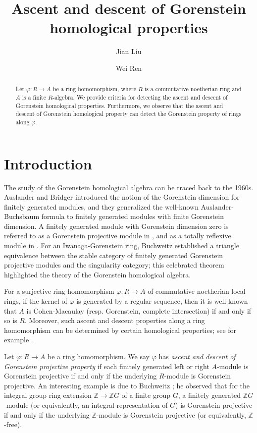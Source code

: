 \documentclass{amsart}
\author[Jian Liu]{Jian Liu}
\author{Wei Ren}
\title{Ascent and descent of Gorenstein homological properties}
\date{}
\newcommand{\Z}{\mathbb{Z}}
\newcommand{\0}{{\bf{0}}}
\theoremstyle{definition}
\begin{document}
\maketitle
\begin{abstract}
Let $\varphi\colon R\rightarrow A$ be a ring homomorphism, where $R$ is a commutative noetherian ring and $A$ is a finite $R$-algebra. We provide criteria for detecting the ascent and descent of Gorenstein homological properties.
Furthermore, we observe that the ascent and descent of Gorenstein homological property can detect the Gorenstein property of rings along  $\varphi$. 
\end{abstract}



\section{Introduction}

The study of the Gorenstein homological algebra can be traced back to the 1960s. Auslander and Bridger \cite{AB}  introduced the notion of the Gorenstein dimension for finitely generated modules, and they generalized the well-known Auslander-Buchsbaum formula to finitely generated modules with finite Gorenstein dimension. A finitely generated module with Gorenstein dimension zero is referred to as a Gorenstein projective module in \cite{EJ1}, and as a totally reflexive module in \cite{AM}. For an Iwanaga-Gorenstein ring, Buchweitz \cite{Buc} established a triangle equivalence between the stable category of finitely generated Gorenstein projective modules and the singularity category; this celebrated theorem highlighted the theory of the Gorenstein homological algebra.

For a surjective ring homomorphism $\varphi\colon R\rightarrow A$ of commutative noetherian local rings, if the kernel of $\varphi$ is generated by a regular sequence, then it is well-known that $A$ is Cohen-Macaulay (resp. Gorenstein, complete intersection) if and only if so is $R$.
Moreover, such ascent and descent properties along a ring homomorphism can be determined by certain homological properties; see for example \cite{AF, AFH, GS}.

Let $\varphi\colon R\rightarrow A$ be a ring homomorphism. We say $\varphi$ has \emph{ascent and descent of Gorenstein projective property} if each finitely generated left or right $A$-module is Gorenstein projective if and only if the underlying $R$-module is Gorenstein projective. An interesting example is due to Buchweitz \cite[8.2]{Buc}; he observed that for the integral group ring extension $\Z\rightarrow \Z G$ of a finite group $G$, a finitely generated $\mathbb{Z}G$-module (or equivalently, an integral representation of $G$) is Gorenstein projective if and only if the underlying $\mathbb{Z}$-module is Gorenstein projective (or equivalently, $\mathbb Z$-free). 
\end{document}
